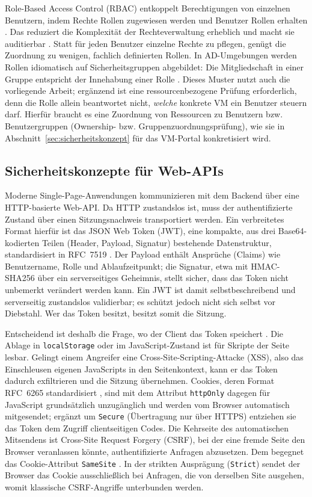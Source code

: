 \documentclass[12pt,a4paper]{article}
\begin{document}
Role-Based Access Control (RBAC) entkoppelt Berechtigungen von einzelnen Benutzern, indem Rechte Rollen zugewiesen werden und Benutzer Rollen erhalten \parencite{sandhu1996rbac,nist-rbac}. Das reduziert die Komplexität der Rechteverwaltung erheblich und macht sie auditierbar \parencite{microsoft-rbac-overview}. Statt für jeden Benutzer einzelne Rechte zu pflegen, genügt die Zuordnung zu wenigen, fachlich definierten Rollen. In AD-Umgebungen werden Rollen idiomatisch auf Sicherheitsgruppen abgebildet: Die Mitgliedschaft in einer Gruppe entspricht der Innehabung einer Rolle \parencite{aglp-model}. Dieses Muster nutzt auch die vorliegende Arbeit; ergänzend ist eine ressourcenbezogene Prüfung erforderlich, denn die Rolle allein beantwortet nicht, \emph{welche} konkrete VM ein Benutzer steuern darf. Hierfür braucht es eine Zuordnung von Ressourcen zu Benutzern bzw. Benutzergruppen (Ownership- bzw. Gruppenzuordnungsprüfung), wie sie in Abschnitt~\ref{sec:sicherheitskonzept} für das VM-Portal konkretisiert wird.

\subsection{Sicherheitskonzepte für Web-APIs}

Moderne Single-Page-Anwendungen kommunizieren mit dem Backend über eine HTTP-basierte Web-API. Da HTTP zustandslos ist, muss der authentifizierte Zustand über einen Sitzungsnachweis transportiert werden. Ein verbreitetes Format hierfür ist das JSON Web Token (JWT), eine kompakte, aus drei Base64-kodierten Teilen (Header, Payload, Signatur) bestehende Datenstruktur, standardisiert in RFC~7519 \parencite{rfc7519}. Der Payload enthält Ansprüche (Claims) wie Benutzername, Rolle und Ablaufzeitpunkt; die Signatur, etwa mit HMAC-SHA256 über ein serverseitiges Geheimnis, stellt sicher, dass das Token nicht unbemerkt verändert werden kann. Ein JWT ist damit selbstbeschreibend und serverseitig zustandslos validierbar; es schützt jedoch nicht sich selbst vor Diebstahl. Wer das Token besitzt, besitzt somit die Sitzung.

Entscheidend ist deshalb die Frage, wo der Client das Token speichert \parencite{owasp-cheatsheet-session}. Die Ablage in \texttt{localStorage} oder im JavaScript-Zustand ist für Skripte der Seite lesbar. Gelingt einem Angreifer eine Cross-Site-Scripting-Attacke (XSS), also das Einschleusen eigenen JavaScripts in den Seitenkontext, kann er das Token dadurch exfiltrieren und die Sitzung übernehmen. Cookies, deren Format RFC~6265 standardisiert \parencite{rfc6265}, sind mit dem Attribut \texttt{httpOnly} dagegen für JavaScript grundsätzlich unzugänglich und werden vom Browser automatisch mitgesendet; ergänzt um \texttt{Secure} (Übertragung nur über HTTPS) entziehen sie das Token dem Zugriff clientseitigen Codes. Die Kehrseite des automatischen Mitsendens ist Cross-Site Request Forgery (CSRF), bei der eine fremde Seite den Browser veranlassen könnte, authentifizierte Anfragen abzusetzen. Dem begegnet das Cookie-Attribut \texttt{SameSite} \parencite{mdn-samesite}. In der strikten Ausprägung (\texttt{Strict}) sendet der Browser das Cookie ausschließlich bei Anfragen, die von derselben Site ausgehen, womit klassische CSRF-Angriffe unterbunden werden.
\end{document}
